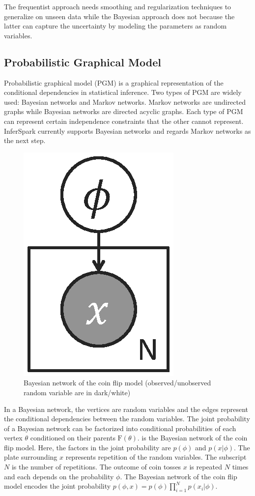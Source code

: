 The frequentist approach needs smoothing and regularization techniques to
generalize on unseen data while the Bayesian approach does not because the
latter can capture the uncertainty by modeling the parameters as random
variables. 

\subsection{Probabilistic Graphical Model}

Probabilistic graphical model \cite{pgm} (PGM) is a graphical representation of the
conditional dependencies in statistical inference. Two types of PGM are widely
used: Bayesian networks and Markov networks. Markov networks are undirected
graphs while Bayesian networks are directed acyclic graphs. Each type of PGM
can represent certain independence constraints that the other cannot represent. 
InferSpark currently supports Bayesian networks and regards Markov networks 
as the next step.  
\begin{figure}[h]
	\centering
	\includegraphics[scale=0.38]{figs/one_coin.eps}
	\caption{Bayesian network of the coin flip model (observed/unobserved random
	variable are in dark/white)}
	\label{fig:coin_bn}
\end{figure}

In a Bayesian network, the vertices are random variables and the edges
represent the conditional dependencies between the random variables.
The joint probability of a Bayesian network can be factorized into conditional
probabilities of each vertex $\theta$ conditioned on their parents
$\mathrm{F}(\theta)$. 
 is the Bayesian network of the coin flip model.  
Here, the factors in the joint
probability are $p(\phi)$ and $p(x|\phi)$. The plate surrounding $x$ represents
repetition of the random variables. The subscript $N$ is the number of
repetitions. The outcome of coin tosses $x$ is repeated $N$ times and
each depends on the probability $\phi$. The Bayesian network of the coin flip
model encodes the joint probability $p(\phi, x) =
p(\phi)\prod_{i=1}^{N}p(x_i|\phi)$. 

